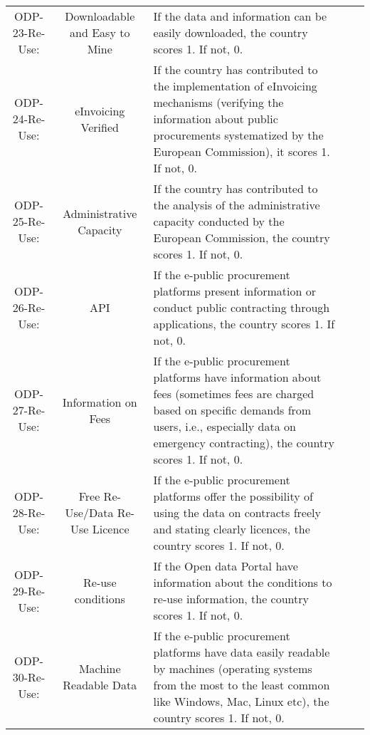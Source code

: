 \documentclass[a4paper, twoside]{report}
\begin{document}
\begin{table}[htbp]
\begin{adjustbox}{max width=\linewidth}
\begin{tabular}{ccp{30em}p{35em}p{31.335em}}
    \midrule
    ODP-23-Re-Use: & Downloadable and Easy to Mine & If the data and information can be easily downloaded, the country scores 1. If not, 0.   \\
    ODP-24-Re-Use: & \cellcolor[rgb]{ .749,  .749,  .749}eInvoicing Verified & \cellcolor[rgb]{ .749,  .749,  .749}If the country has contributed to the implementation of eInvoicing mechanisms (verifying the information about public procurements systematized by the European Commission), it scores 1. If not, 0. \\
    ODP-25-Re-Use: & Administrative Capacity & If the country has contributed to the analysis of the administrative capacity conducted by the European Commission, the country scores 1. If not, 0.   \\
    ODP-26-Re-Use: & API   & If the e-public procurement platforms present information or conduct public contracting through applications, the country scores 1. If not, 0. \\
    ODP-27-Re-Use: & \cellcolor[rgb]{ .749,  .749,  .749}Information on Fees & \cellcolor[rgb]{ .749,  .749,  .749}If the e-public procurement platforms have information about fees (sometimes fees are charged based on specific demands from users, i.e., especially data on emergency contracting), the country scores 1. If not, 0.  \\
    ODP-28-Re-Use: & \cellcolor[rgb]{ .749,  .749,  .749}Free Re-Use/Data Re-Use Licence & \cellcolor[rgb]{ .749,  .749,  .749}If the e-public procurement platforms offer the possibility of using the data on contracts freely and stating clearly licences, the country scores 1. If not, 0. \\
    ODP-29-Re-Use: & \cellcolor[rgb]{ .749,  .749,  .749}Re-use conditions & \cellcolor[rgb]{ .749,  .749,  .749}If the Open data Portal have information about the conditions to re-use information, the country scores 1. If not, 0. \\
    ODP-30-Re-Use: & \cellcolor[rgb]{ .749,  .749,  .749}Machine Readable Data & \cellcolor[rgb]{ .749,  .749,  .749}If the e-public procurement platforms have data easily readable by machines (operating systems from the most to the least common like Windows, Mac, Linux etc), the country scores 1. If not, 0. \\
    \bottomrule
    \end{tabular}%
    \end{adjustbox}
  \label{tab:definitions5}%
\end{table}%
\end{document}
